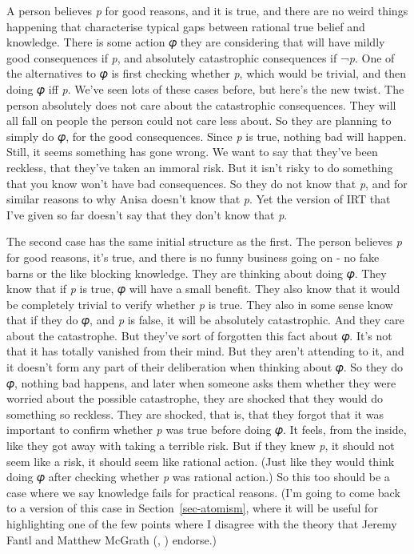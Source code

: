\documentclass[
  10pt,
  letterpaper,
  twoside]{scrbook}
\begin{document}
A person believes \emph{p} for good reasons, and it is true, and there
are no weird things happening that characterise typical gaps between
rational true belief and knowledge. There is some action 𝜑 they are
considering that will have mildly good consequences if \emph{p}, and
absolutely catastrophic consequences if ¬\emph{p}. One of the
alternatives to 𝜑 is first checking whether \emph{p}, which would be
trivial, and then doing 𝜑 iff \emph{p}. We've seen lots of these cases
before, but here's the new twist. The person absolutely does not care
about the catastrophic consequences. They will all fall on people the
person could not care less about. So they are planning to simply do 𝜑,
for the good consequences. Since \emph{p} is true, nothing bad will
happen. Still, it seems something has gone wrong. We want to say that
they've been reckless, that they've taken an immoral risk. But it isn't
risky to do something that you know won't have bad consequences. So they
do not know that \emph{p}, and for similar reasons to why Anisa doesn't
know that \emph{p}. Yet the version of IRT that I've given so far
doesn't say that they don't know that \emph{p}.

The second case has the same initial structure as the first. The person
believes \emph{p} for good reasons, it's true, and there is no funny
business going on - no fake barns or the like blocking knowledge. They
are thinking about doing 𝜑. They know that if \emph{p} is true, 𝜑 will
have a small benefit. They also know that it would be completely trivial
to verify whether \emph{p} is true. They also in some sense know that if
they do 𝜑, and \emph{p} is false, it will be absolutely catastrophic.
And they care about the catastrophe. But they've sort of forgotten this
fact about 𝜑. It's not that it has totally vanished from their mind. But
they aren't attending to it, and it doesn't form any part of their
deliberation when thinking about 𝜑. So they do 𝜑, nothing bad happens,
and later when someone asks them whether they were worried about the
possible catastrophe, they are shocked that they would do something so
reckless. They are shocked, that is, that they forgot that it was
important to confirm whether \emph{p} was true before doing 𝜑. It feels,
from the inside, like they got away with taking a terrible risk. But if
they knew \emph{p}, it should not seem like a risk, it should seem like
rational action. (Just like they would think doing 𝜑 after checking
whether \emph{p} was rational action.) So this too should be a case
where we say knowledge fails for practical reasons. (I'm going to come
back to a version of this case in Section~\ref{sec-atomism}, where it
will be useful for highlighting one of the few points where I disagree
with the theory that Jeremy Fantl and Matthew McGrath
(,
) endorse.)
\end{document}
